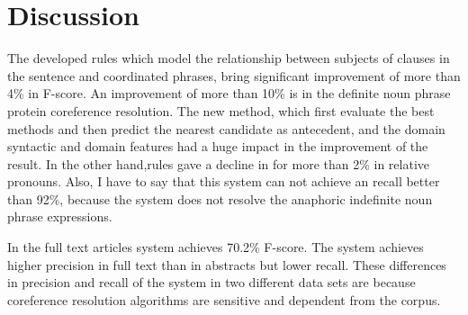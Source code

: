 \section{Discussion}
The developed rules which model the relationship between subjects of clauses in the sentence and coordinated phrases, bring significant improvement of more than 4\% in F-score. An improvement of more than 10\% is in the definite noun phrase protein coreference resolution. The new method, which first evaluate the best methods and then predict the nearest candidate as antecedent, and the domain syntactic and domain features had a huge impact in the improvement of the result.  In the other hand,rules gave a decline in for more than 2\% in relative pronouns. Also, I have to say that this system can not achieve an recall better than 92\%, because the system does not resolve the anaphoric indefinite noun phrase expressions. 

In the full text articles system achieves 70.2\% F-score. The system achieves higher precision in full text than in abstracts but lower recall. These differences in precision and recall  of the system in two different data sets are because coreference resolution algorithms are sensitive and dependent from the corpus.